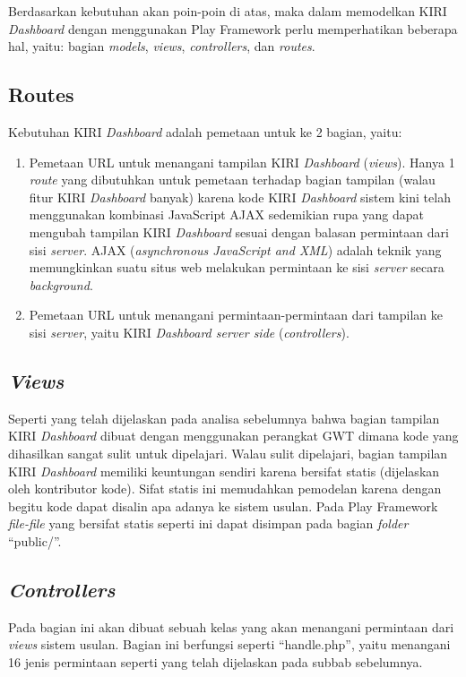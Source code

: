 Berdasarkan kebutuhan akan poin-poin di atas, maka dalam memodelkan KIRI \textit{Dashboard} dengan menggunakan Play Framework perlu memperhatikan beberapa hal, yaitu: bagian \textit{models}, \textit{views}, \textit{controllers}, dan \textit{routes}.

\subsection{Routes}
\label{sec:routesusulan}
Kebutuhan KIRI \textit{Dashboard} adalah pemetaan untuk ke 2 bagian, yaitu:
\begin{enumerate}
	\item Pemetaan URL untuk menangani tampilan KIRI \textit{Dashboard} (\textit{views}). Hanya 1 \textit{route} yang dibutuhkan untuk pemetaan terhadap bagian tampilan (walau fitur KIRI \textit{Dashboard} banyak) karena kode KIRI \textit{Dashboard} sistem kini telah menggunakan kombinasi JavaScript  AJAX sedemikian rupa yang dapat mengubah tampilan KIRI \textit{Dashboard} sesuai dengan balasan permintaan dari sisi \textit{server}. AJAX (\textit{asynchronous JavaScript and XML}) adalah teknik yang memungkinkan suatu situs web melakukan permintaan ke sisi \textit{server} secara \textit{background}\cite{w3schools}.
	\item Pemetaan URL untuk menangani permintaan-permintaan dari tampilan ke sisi \textit{server}, yaitu KIRI \textit{Dashboard server side} (\textit{controllers}).
\end{enumerate}

\subsection{\textit{Views}}
\label{sec:viewusulan}
Seperti yang telah dijelaskan pada analisa sebelumnya bahwa bagian tampilan KIRI \textit{Dashboard} dibuat dengan menggunakan perangkat GWT dimana kode yang dihasilkan sangat sulit untuk dipelajari. Walau sulit dipelajari, bagian tampilan KIRI \textit{Dashboard} memiliki keuntungan sendiri karena bersifat statis (dijelaskan oleh kontributor kode). Sifat statis ini memudahkan pemodelan karena dengan begitu kode dapat disalin apa adanya ke sistem usulan. Pada Play Framework \textit{file-file} yang bersifat statis seperti ini dapat disimpan pada bagian \textit{folder} ``public/''.

\subsection{\textit{Controllers}}
\label{sec:controllerusulan}
Pada bagian ini akan dibuat sebuah kelas yang akan menangani permintaan dari \textit{views} sistem usulan. Bagian ini berfungsi seperti ``handle.php'', yaitu menangani 16 jenis permintaan seperti yang telah dijelaskan pada subbab sebelumnya.

